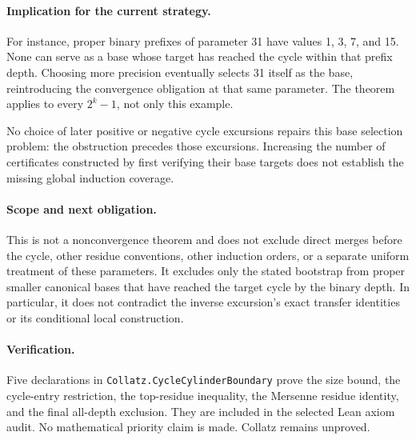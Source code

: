\documentclass[11pt]{article}
\begin{document}
\paragraph{Implication for the current strategy.}
For instance, proper binary prefixes of parameter 31 have values
1, 3, 7, and 15. None can serve as a base whose target has reached the
cycle within that prefix depth. Choosing more precision eventually selects
31 itself as the base, reintroducing the convergence obligation at that
same parameter. The theorem applies to every $2^k-1$, not only this example.

No choice of later positive or negative cycle excursions repairs this base
selection problem: the obstruction precedes those excursions. Increasing the
number of certificates constructed by first verifying their base targets does
not establish the missing global induction coverage.

\paragraph{Scope and next obligation.}
This is not a nonconvergence theorem and does not exclude direct merges before
the cycle, other residue conventions, other induction orders, or a separate
uniform treatment of these parameters. It excludes only the stated bootstrap
from proper smaller canonical bases that have reached the target cycle by the
binary depth. In particular, it does not contradict the inverse excursion's
exact transfer identities or its conditional local construction.

\paragraph{Verification.}
\begingroup\raggedright
Five declarations in \texttt{Collatz.CycleCylinderBoundary} prove the size bound,
the cycle-entry restriction, the top-residue inequality, the Mersenne residue
identity, and the final all-depth exclusion. They are included in the selected
Lean axiom audit. No mathematical priority claim is made. Collatz remains unproved.
\par\endgroup
\end{document}
